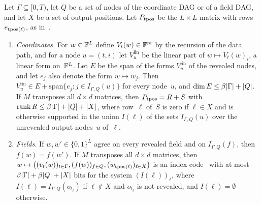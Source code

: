 \begin{lemma}[Expansion]\label{lem:expansion}
Let $\Gamma\subseteq[0,T)$, let $Q$ be a set of nodes of the coordinate DAG or of a field DAG, and let $X$ be a set of
output positions. Let $P_{\operatorname{tpos}}$ be the $L\times L$ matrix with rows $e_{\operatorname{tpos}(\ell)}$, as
in~\cite[Section~7.2]{BoundedNesting2026}.
\begin{enumerate}[label=(\alph*)]
\item \emph{Coordinates.} For $w\in\mathbb{F}^L$ define $V_t(w)\in\mathbb{F}^m$ by the recursion of the data path, and for a node
$u=(t,i)$ let $V_u^{\mathrm{lin}}$ be the linear part of $w\mapsto V_t(w)_i$, a linear form on~$\mathbb{F}^L$. Let $E$ be the
span of the forms $V^{\mathrm{lin}}_u$ of the revealed nodes, and let $e_j$ also denote the form $w\mapsto w_j$. Then
$V^{\mathrm{lin}}_u\in E+\mathrm{span}\{e_j:j\in I_{\Gamma,Q}(u)\}$ for every node~$u$, and
$\dim E\le\beta\lvert \Gamma \rvert+\lvert Q \rvert$. If $M$ transposes all $d\times d$ matrices, then $P_{\operatorname{tpos}}=R+S$ with
$\operatorname{rank} R\le\beta\lvert \Gamma \rvert+\lvert Q \rvert+\lvert X \rvert$, where row~$\ell$ of~$S$ is zero if $\ell\in X$ and is otherwise supported
in the union $I(\ell)$ of the sets $I_{\Gamma,Q}(u)$ over the unrevealed output nodes~$u$ of~$\ell$.
\item \emph{Fields.} If $w,w'\in\{0,1\}^L$ agree on every revealed field and on $I_{\Gamma,Q}(f)$, then
$f(w)=f(w')$. If $M$ transposes all $d\times d$ matrices, then
$w\mapsto\bigl((v_t(w))_{t\in\Gamma},(f(w))_{f\in Q},(w_{\operatorname{tpos}(\ell)})_{\ell\in X}\bigr)$ is an index
code~\cite[Definition~4.8]{FourthPaper2026} with at most $\beta\lvert \Gamma \rvert+\beta\lvert Q \rvert+\lvert X \rvert$ bits for the system
$(I(\ell))_\ell$, where $I(\ell)=I_{\Gamma,Q}(o_{t_\ell})$ if $\ell\notin X$ and $o_{t_\ell}$ is not revealed, and
$I(\ell)=\emptyset$ otherwise.
\end{enumerate}
\end{lemma}

